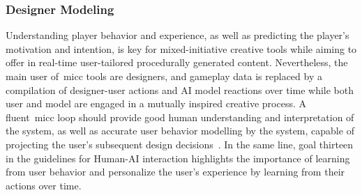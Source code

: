 
\subsubsection{Designer Modeling}

Understanding player behavior and experience, as well as predicting the player's motivation and intention, is key for mixed-initiative creative tools while aiming to offer in real-time user-tailored procedurally generated content. Nevertheless, the main user of~\acrshort{micc} tools are designers, and gameplay data is replaced by a compilation of designer-user actions and AI model reactions over time while both user and model are engaged in a mutually inspired creative process. A fluent~\acrshort{micc} loop should provide good human understanding and interpretation of the system, as well as accurate user behavior modelling by the system, capable of projecting the user's subsequent design decisions~\cite{compton_casual_2019}. In the same line, goal thirteen in the guidelines for Human-AI interaction \cite{amershi_guidelines_2019} highlights the importance of learning from user behavior and personalize the user’s experience by learning from their actions over time. 

